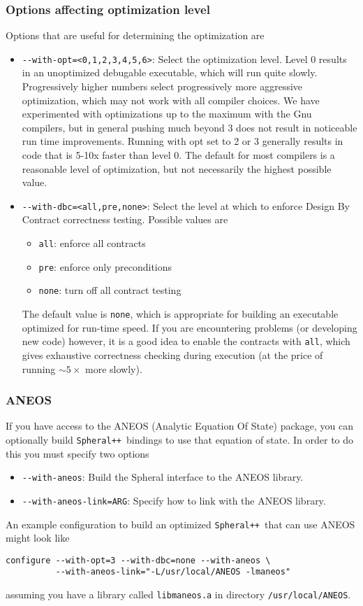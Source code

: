 \documentclass{article}
\newcommand{\Spheral}{{\tt Spheral++}}
\begin{document}
\subsubsection{Options affecting optimization level}
Options that are useful for determining the optimization are
\begin{itemize}
\item \verb+--with-opt=<0,1,2,3,4,5,6>+: Select the optimization level.  Level 0
results in an unoptimized debugable executable, which will run quite slowly.
Progressively higher numbers select progressively more aggressive optimization,
which may not work with all compiler choices.  We have experimented with
optimizations up to the maximum with the Gnu compilers, but in general pushing
much beyond 3 does not result in noticeable run time improvements.  Running with
opt set to 2 or 3 generally results in code that is 5-10x faster than level 0.
The default for most compilers is a reasonable level of optimization, but not
necessarily the highest possible value.
\item \verb+--with-dbc=<all,pre,none>+: Select the level at which to enforce
Design By Contract correctness testing.  Possible values are
\begin{itemize}
\item \verb+all+: enforce all contracts
\item \verb+pre+: enforce only preconditions
\item \verb+none+: turn off all contract testing
\end{itemize}
The default value is \verb+none+, which is appropriate for building an
executable optimized for run-time speed.  If you are encountering problems (or
developing new code) however, it is a good idea to enable the contracts with
\verb+all+, which gives exhaustive correctness checking during execution (at the
price of running $\sim 5\times$ more slowly).
\end{itemize}

\subsubsection{ANEOS}
If you have access to the ANEOS (Analytic Equation Of State) package, you can
optionally build \Spheral\ bindings to use that equation of state.  In order to
do this you must specify two options
\begin{itemize}
\item \verb+--with-aneos+: Build the Spheral interface to the ANEOS library.
\item \verb+--with-aneos-link=ARG+: Specify how to link with the ANEOS library.
\end{itemize}
An example configuration to build an optimized \Spheral\ that can use ANEOS
might look like
\begin{verbatim}
configure --with-opt=3 --with-dbc=none --with-aneos \
          --with-aneos-link="-L/usr/local/ANEOS -lmaneos"
\end{verbatim}
assuming you have a library called \verb+libmaneos.a+ in directory
\verb+/usr/local/ANEOS+.
\end{document}
